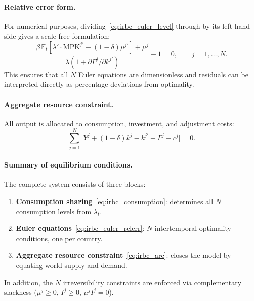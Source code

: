 \documentclass[11pt,a4paper]{report}
\begin{document}
\paragraph{Relative error form.}  For numerical purposes, dividing~\eqref{eq:irbc_euler_level} through by its left-hand side gives a scale-free formulation:
\begin{equation}
\frac{\beta\,\mathbb{E}_t\!\left[\lambda' \cdot \mathrm{MPK}^{j\prime} - (1-\delta)\mu^{j\prime}\right] + \mu^j}{\lambda(1+\partial\Gamma^j/\partial k^{j\prime})} - 1 = 0, \qquad j=1,\ldots,N.
\label{eq:irbc_euler_relerr}
\end{equation}
This ensures that all $N$ Euler equations are dimensionless and residuals can be interpreted directly as percentage deviations from optimality.

\paragraph{Aggregate resource constraint.}  All output is allocated to consumption, investment, and adjustment costs:
\begin{equation}
\sum_{j=1}^{N}\bigl[Y^j + (1-\delta)k^j - k^{j\prime} - \Gamma^j - c^j\bigr] = 0.
\label{eq:irbc_arc}
\end{equation}

\paragraph{Summary of equilibrium conditions.}  The complete system consists of three blocks:
\begin{enumerate}[itemsep=2pt]
\item \textbf{Consumption sharing}~\eqref{eq:irbc_consumption}: determines all $N$ consumption levels from $\lambda_t$.
\item \textbf{Euler equations}~\eqref{eq:irbc_euler_relerr}: $N$ intertemporal optimality conditions, one per country.
\item \textbf{Aggregate resource constraint}~\eqref{eq:irbc_arc}: closes the model by equating world supply and demand.
\end{enumerate}
In addition, the $N$ irreversibility constraints are enforced via complementary slackness ($\mu^j \geq 0$, $I^j \geq 0$, $\mu^j I^j = 0$).
\end{document}
